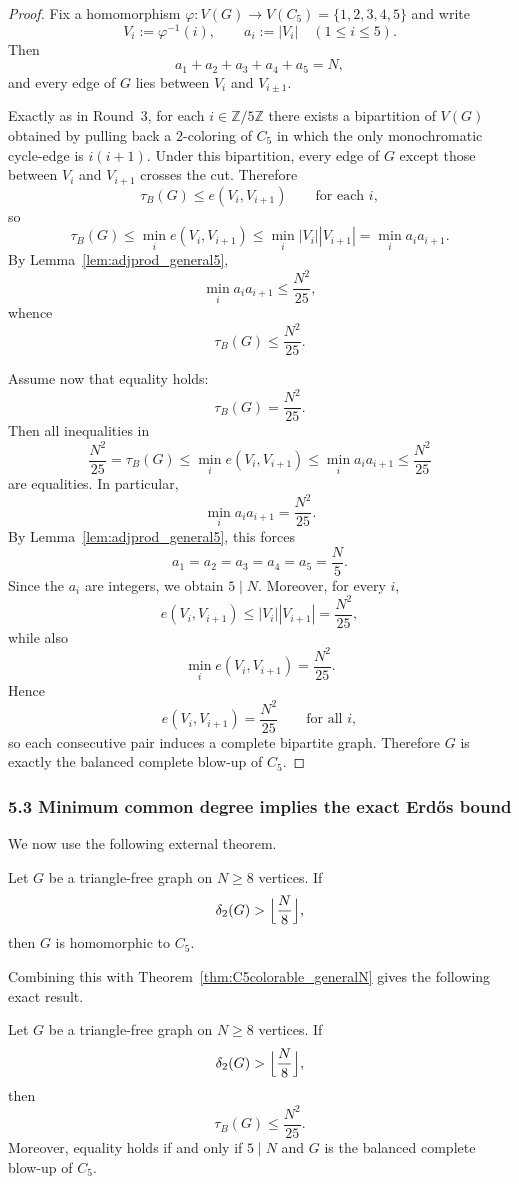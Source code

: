 \begin{proof}
Fix a homomorphism $\varphi:V(G)\to V(C_5)=\{1,2,3,4,5\}$ and write
\[
V_i:=\varphi^{-1}(i),\qquad a_i:=|V_i| \quad (1\le i\le 5).
\]
Then
\[
a_1+a_2+a_3+a_4+a_5=N,
\]
and every edge of $G$ lies between $V_i$ and $V_{i\pm 1}$.

Exactly as in Round~3, for each $i\in\mathbb Z/5\mathbb Z$ there exists a bipartition of $V(G)$
obtained by pulling back a $2$-coloring of $C_5$ in which the only monochromatic cycle-edge is
$i(i+1)$.  Under this bipartition, every edge of $G$ except those between $V_i$ and $V_{i+1}$
crosses the cut.  Therefore
\[
\tau_B(G)\le e(V_i,V_{i+1}) \qquad\text{for each }i,
\]
so
\[
\tau_B(G)\le \min_i e(V_i,V_{i+1})\le \min_i |V_i||V_{i+1}|=\min_i a_i a_{i+1}.
\]
By Lemma~\ref{lem:adjprod_general5},
\[
\min_i a_i a_{i+1}\le \frac{N^2}{25},
\]
whence
\[
\tau_B(G)\le \frac{N^2}{25}.
\]

Assume now that equality holds:
\[
\tau_B(G)=\frac{N^2}{25}.
\]
Then all inequalities in
\[
\frac{N^2}{25}=\tau_B(G)\le \min_i e(V_i,V_{i+1})\le \min_i a_i a_{i+1}\le \frac{N^2}{25}
\]
are equalities.  In particular,
\[
\min_i a_i a_{i+1}=\frac{N^2}{25}.
\]
By Lemma~\ref{lem:adjprod_general5}, this forces
\[
a_1=a_2=a_3=a_4=a_5=\frac{N}{5}.
\]
Since the $a_i$ are integers, we obtain $5\mid N$.
Moreover, for every $i$,
\[
e(V_i,V_{i+1})\le |V_i||V_{i+1}|=\frac{N^2}{25},
\]
while also
\[
\min_i e(V_i,V_{i+1})=\frac{N^2}{25}.
\]
Hence
\[
e(V_i,V_{i+1})=\frac{N^2}{25}
\qquad\text{for all }i,
\]
so each consecutive pair induces a complete bipartite graph.  Therefore $G$ is exactly the balanced
complete blow-up of $C_5$.
\end{proof}

\subsubsection*{5.3 Minimum common degree implies the exact Erd\H{o}s bound}
We now use the following external theorem.

\begin{theorem}\label{thm:WYZ_delta2_to_C5}
Let $G$ be a triangle-free graph on $N\ge 8$ vertices.  If
\[
\delta_2(G)>\Bigl\lfloor\frac{N}{8}\Bigr\rfloor,
\]
then $G$ is homomorphic to $C_5$.
\end{theorem}

Combining this with Theorem~\ref{thm:C5colorable_generalN} gives the following exact result.

\begin{theorem}\label{thm:delta2_implies_bound}
Let $G$ be a triangle-free graph on $N\ge 8$ vertices.  If
\[
\delta_2(G)>\Bigl\lfloor\frac{N}{8}\Bigr\rfloor,
\]
then
\[
\tau_B(G)\le \frac{N^2}{25}.
\]
Moreover, equality holds if and only if $5\mid N$ and $G$ is the balanced complete blow-up of $C_5$.
\end{theorem}

